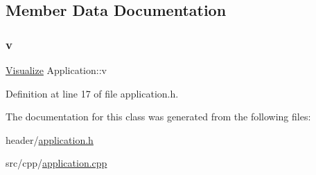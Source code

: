 \subsection{Member Data Documentation}
\mbox{\label{class_application_a96cff2295a95d7e6de06638bb7e61243}} 
\subsubsection{\texorpdfstring{v}{v}}
{\footnotesize\ttfamily \hyperlink{class_visualize}{Visualize} Application\+::v}



Definition at line 17 of file application.\+h.



The documentation for this class was generated from the following files\+:\begin{DoxyCompactItemize}
\item 
header/\hyperlink{application_8h}{application.\+h}\item 
src/cpp/\hyperlink{application_8cpp}{application.\+cpp}\end{DoxyCompactItemize}
